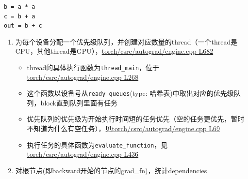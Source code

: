 \begin{lstlisting}
b = a * a
c = b + a
out = b + c
\end{lstlisting}

\begin{enumerate}
\def\labelenumi{\arabic{enumi}.}
\tightlist
\item
  为每个设备分配一个优先级队列，并创建对应数量的thread（一个thread是CPU，其他thread是GPU），\href{https://github.com/pytorch/pytorch/blob/master/torch/csrc/autograd/engine.cpp\#L682}{torch/csrc/autograd/engine.cpp
  L682}

  \begin{itemize}
  \tightlist
  \item
    thread的具体执行函数为\texttt{thread\_main}，位于\href{https://github.com/pytorch/pytorch/blob/master/torch/csrc/autograd/engine.cpp\#L268}{torch/csrc/autograd/engine.cpp
    L268}
  \item
    这个函数以设备号从\texttt{ready\_queues}(type:
    哈希表)中取出对应的优先级队列，block直到队列里面有任务
  \item
    优先队列的优先级为开始执行时间短的任务优先（空的任务更优先，暂时不知道为什么有空任务），见\href{https://github.com/pytorch/pytorch/blob/master/torch/csrc/autograd/engine.cpp\#L70}{torch/csrc/autograd/engine.cpp
    L69}
  \item
    执行任务的具体函数为\texttt{evaluate\_function}，见\href{https://github.com/pytorch/pytorch/blob/master/torch/csrc/autograd/engine.cpp\#L437}{torch/csrc/autograd/engine.cpp
    L436}
  \end{itemize}
\item
  对根节点(即backward开始的节点的grad\_fn)，统计dependencies


\end{enumerate}
